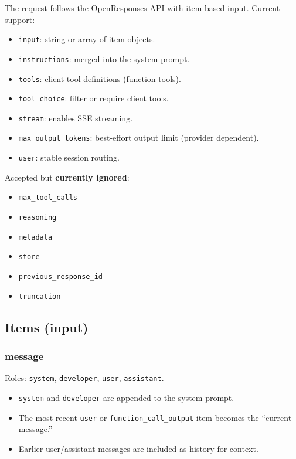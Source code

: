 The request follows the OpenResponses API with item-based input. Current support:

\begin{itemize}
  \item \texttt{input}: string or array of item objects.
  \item \texttt{instructions}: merged into the system prompt.
  \item \texttt{tools}: client tool definitions (function tools).
  \item \texttt{tool\_choice}: filter or require client tools.
  \item \texttt{stream}: enables SSE streaming.
  \item \texttt{max\_output\_tokens}: best-effort output limit (provider dependent).
  \item \texttt{user}: stable session routing.
\end{itemize}


Accepted but \textbf{currently ignored}:

\begin{itemize}
  \item \texttt{max\_tool\_calls}
  \item \texttt{reasoning}
  \item \texttt{metadata}
  \item \texttt{store}
  \item \texttt{previous\_response\_id}
  \item \texttt{truncation}
\end{itemize}


\subsection{Items (input)}


\subsubsection{message}


Roles: \texttt{system}, \texttt{developer}, \texttt{user}, \texttt{assistant}.

\begin{itemize}
  \item \texttt{system} and \texttt{developer} are appended to the system prompt.
  \item The most recent \texttt{user} or \texttt{function\_call\_output} item becomes the “current message.”
  \item Earlier user/assistant messages are included as history for context.
\end{itemize}



